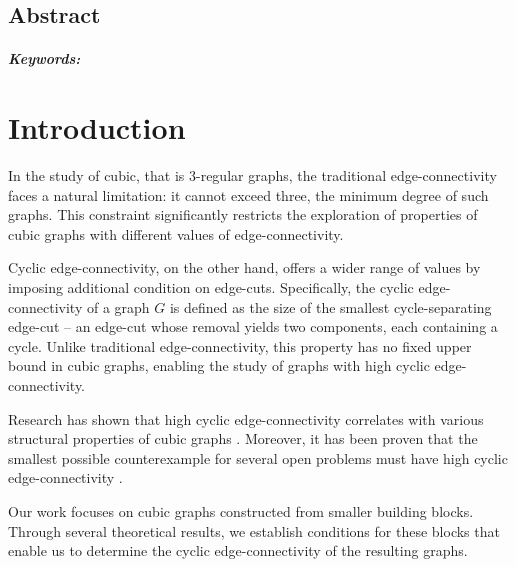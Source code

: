 \documentclass[12pt, twoside]{book}
\begin{document}
\newpage

\begin{otherlanguage}{USenglish}
    \section*{Abstract}

    \thesisabstracten{}

    \paragraph*{Keywords:} \thesiskeywordsen{}
\end{otherlanguage}

\newpage
\tableofcontents

\newpage
\listoffigures

\mainmatter{}

\chapter*{Introduction}

In the study of cubic, that is 3-regular graphs, the traditional edge-connectivity faces a natural limitation: it cannot exceed three, the minimum degree of such graphs. This constraint significantly restricts the exploration of properties of cubic graphs with different values of edge-connectivity.

Cyclic edge-connectivity, on the other hand, offers a wider range of values by imposing additional condition on edge-cuts. Specifically, the cyclic edge-connectivity of a graph $G$ is defined as the size of the smallest cycle-separating edge-cut -- an edge-cut whose removal yields two components, each containing a cycle. Unlike traditional edge-connectivity, this property has no fixed upper bound in cubic graphs, enabling the study of graphs with high cyclic edge-connectivity.

Research has shown that high cyclic \mbox{edge-connectivity} correlates with various structural properties of cubic graphs \cite{Doslic2003, McCuaig1992, Andersen1988}. Moreover, it has been proven that the smallest possible counterexample for several open problems must have high cyclic edge-connectivity \cite{Macajova2020, Kochol2004}.

Our work focuses on cubic graphs constructed from smaller building blocks. Through several theoretical results, we establish conditions for these blocks that enable us to determine the cyclic \mbox{edge-connectivity} of the resulting graphs.
\end{document}
